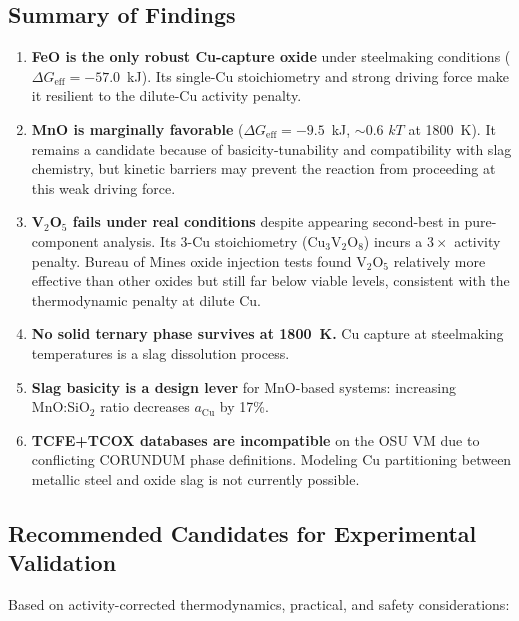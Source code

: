 \documentclass[11pt]{article}
\begin{document}
\subsection{Summary of Findings}

\begin{enumerate}[leftmargin=*]
    \item \textbf{FeO is the only robust Cu-capture oxide} under steelmaking conditions ($\Delta G_{\text{eff}} = -57.0$~kJ). Its single-Cu stoichiometry and strong driving force make it resilient to the dilute-Cu activity penalty.

    \item \textbf{MnO is marginally favorable} ($\Delta G_{\text{eff}} = -9.5$~kJ, $\sim$0.6 $kT$ at \SI{1800}{\kelvin}). It remains a candidate because of basicity-tunability and compatibility with slag chemistry, but kinetic barriers may prevent the reaction from proceeding at this weak driving force.

    \item \textbf{V$_2$O$_5$ fails under real conditions} despite appearing second-best in pure-component analysis. Its 3-Cu stoichiometry (Cu$_3$V$_2$O$_8$) incurs a $3\times$ activity penalty. Bureau of Mines oxide injection tests found V$_2$O$_5$ relatively more effective than other oxides but still far below viable levels, consistent with the thermodynamic penalty at dilute Cu.

    \item \textbf{No solid ternary phase survives at \SI{1800}{\kelvin}.} Cu capture at steelmaking temperatures is a slag dissolution process.

    \item \textbf{Slag basicity is a design lever} for MnO-based systems: increasing MnO:SiO$_2$ ratio decreases $a_{\text{Cu}}$ by 17\%.

    \item \textbf{TCFE+TCOX databases are incompatible} on the OSU VM due to conflicting CORUNDUM phase definitions. Modeling Cu partitioning between metallic steel and oxide slag is not currently possible.
\end{enumerate}

\subsection{Recommended Candidates for Experimental Validation}

Based on activity-corrected thermodynamics, practical, and safety considerations:
\end{document}
